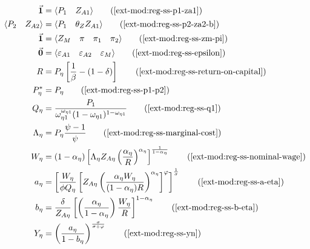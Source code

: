 \documentclass[../thesis.tex]{subfiles}
\begin{document}
	\begin{align}
		\vec{\bm{1}} &= \langle \begin{matrix} P_{1} & Z_{A1} \end{matrix} \rangle \tag{\ref{ext-mod:reg-ss-p1-za1}}
		\\ 
		\langle \begin{matrix} P_{2} & Z_{A2} \end{matrix} \rangle &= \langle \begin{matrix} P_{1} & \theta_{Z} Z_{A1} \end{matrix} \rangle \tag{\ref{ext-mod:reg-ss-p2-za2-b}}
		\\
		\vec{\bm{1}} &= \langle \begin{matrix} Z_{M} & \pi & \pi_{1} & \pi_{2} \end{matrix} \rangle \tag{\ref{ext-mod:reg-ss-zm-pi}}
		\\
		\vec{\bm{0}} &= \langle \begin{matrix} \varepsilon_{A1} & \varepsilon_{A2} & \varepsilon_{M} \end{matrix} \rangle \tag{\ref{ext-mod:reg-ss-epsilon}}
		\\
		R &= P_{\eta} \left[ \frac{1}{\beta} - (1- \delta) \right] \tag{\ref{ext-mod:reg-ss-return-on-capital}}
		\\
		P_{\eta}^{\ast} &= P_{\eta} \tag{\ref{ext-mod:reg-ss-p1-p2}} 
		\\
		Q_{\eta} &= \frac{ P_{1} }{\omega_{\eta 1}^{\omega_{\eta 1}} (1 - \omega_{\eta 1})^{1 - \omega_{\eta 1}}} \tag{\ref{ext-mod:reg-ss-q1}}
		\\
		\Lambda_{\eta} &= P_{\eta} \frac{\psi-1}{\psi} \tag{\ref{ext-mod:reg-ss-marginal-cost}} 
		\\
		W_{\eta} &= \left( 1 - \alpha_{\eta} \right) \left[ \Lambda_{\eta} Z_{A\eta} \left( \frac{\alpha_{\eta}}{R} \right)^{\alpha_{\eta}} \right]^{\frac{1}{1 - \alpha_{\eta}}} \tag{\ref{ext-mod:reg-ss-nominal-wage}}
		\\
		a_{\eta} &= \left[ \frac{W_{\eta}}{\phi Q_{\eta}} \left[ Z_{A\eta} \left( \frac{\alpha_{\eta} W_{\eta}}{(1 - \alpha_{\eta}) R} \right)^{\alpha_{\eta}} \right]^{\varphi} \right]^{\frac{1}{\sigma}} \tag{\ref{ext-mod:reg-ss-a-eta}}
		\\
		b_{\eta} &= \frac{\delta}{Z_{A\eta}} \left[ \left( \frac{{\alpha_{\eta}}}{1-\alpha_{\eta}} \right) \frac{W_{\eta}}{R} \right]^{1 - \alpha_{\eta}} \tag{\ref{ext-mod:reg-ss-b-eta}}
		\\
		Y_{\eta} &= \left( \frac{a_{\eta}}{1 - b_{\eta}} \right)^{\frac{\sigma}{\sigma + \varphi}} \tag{\ref{ext-mod:reg-ss-yn}}

\end{align}
\end{document}
